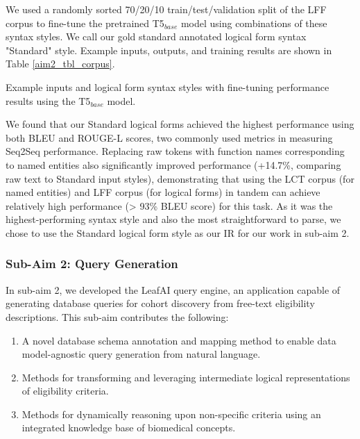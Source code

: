\documentclass[../main.tex]{subfiles}
\begin{document}
We used a randomly sorted 70/20/10 train/test/validation split of the LFF corpus to fine-tune the pretrained T5$_{base}$ model using combinations of these syntax styles. We call our gold standard annotated logical form syntax "Standard" style. Example inputs, outputs, and training results are shown in Table \ref{aim2_tbl_corpus}. 

\begin{table}[h!]
    \footnotesize
    \centering
    
    \caption{Example inputs and logical form syntax styles with fine-tuning performance results using the T5$_{base}$ model.}
    \label{aim2_tbl_corpus}
\end{table} 

We found that our Standard logical forms achieved the highest performance using both BLEU \cite{lin2004rouge} and ROUGE-L \cite{ callison2006re} scores, two commonly used metrics in measuring Seq2Seq performance. Replacing raw tokens with function names corresponding to named entities also significantly improved performance (+14.7\%, comparing raw text to Standard input styles), demonstrating that using the LCT corpus (for named entities) and LFF corpus (for logical forms) in tandem can achieve relatively high performance (> 93\% BLEU score) for this task. As it was the highest-performing syntax style and also the most straightforward to parse, we chose to use the Standard logical form style as our IR for our work in sub-aim 2.

\subsubsection{Sub-Aim 2: Query Generation}
In sub-aim 2, we developed the LeafAI query engine, an application capable of generating database queries for cohort discovery from free-text eligibility descriptions. This sub-aim contributes the following:

\begin{enumerate}
    \item{A novel database schema annotation and mapping method to enable data model-agnostic query generation from natural language.}
    \item{Methods for transforming and leveraging intermediate logical representations of eligibility criteria.}
    \item{Methods for dynamically reasoning upon non-specific criteria using an integrated knowledge base of biomedical concepts.}
\end{enumerate}
\end{document}
